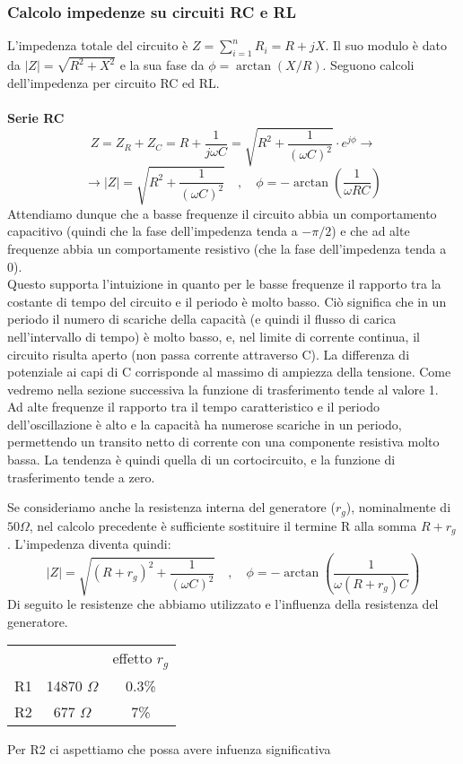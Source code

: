 \subsubsection{Calcolo impedenze su circuiti RC e RL}
L'impedenza totale del circuito è $Z = \sum_{i=1}^n R_i = R + jX$. Il suo modulo è dato da $|Z| = \sqrt{R^2 + X^2}$ e la sua fase da $\phi = \arctan (X/R)$. Seguono calcoli dell'impedenza per circuito RC ed RL.\\\\
%
\textbf{Serie RC}
    $$Z = Z_R+Z_C = R + \frac{1}{j\omega C} = \sqrt{ R^2+\frac{1}{(\omega C)^2} } \cdot{} e^{j\phi} \rightarrow $$
    $$\rightarrow|Z|= \sqrt{ R^2+\frac{1}{(\omega C)^2} } \quad,\quad \phi = -\arctan \left(\frac{1}{\omega R C}\right)$$
Attendiamo dunque che a basse frequenze il circuito abbia un comportamento capacitivo (quindi che la fase dell'impedenza tenda a $-\pi/2$) e che ad alte frequenze abbia un comportamente resistivo (che la fase dell'impedenza tenda a 0).\\
Questo supporta l'intuizione in quanto per le basse frequenze il rapporto tra la costante di tempo del circuito e il periodo è molto basso. Ciò significa che in un periodo il numero di scariche della capacità (e quindi il flusso di carica nell'intervallo di tempo) è molto basso, e, nel limite di corrente continua, il circuito risulta aperto (non passa corrente attraverso C). La differenza di potenziale ai capi di C corrisponde al massimo di ampiezza della tensione. Come vedremo nella sezione successiva la funzione di trasferimento tende al valore 1.\\
Ad alte frequenze il rapporto tra il tempo caratteristico e il periodo dell'oscillazione è alto e la capacità ha numerose scariche in un periodo, permettendo un transito netto di corrente con una componente resistiva molto bassa. La tendenza è quindi quella di un cortocircuito, e la funzione di trasferimento tende a zero.

Se consideriamo anche la resistenza interna del generatore ($r_g$), nominalmente di $50 \Omega$, nel calcolo precedente è sufficiente sostituire il termine R alla somma $R + r_g$. L'impedenza diventa quindi:
 $$|Z|= \sqrt{ (R+r_g)^2+\frac{1}{(\omega C)^2} } \quad,\quad \phi = -\arctan (\frac{1}{\omega (R+r_g) C})$$
%
Di seguito le resistenze che abbiamo utilizzato e l'influenza della resistenza del generatore.
\begin{center}
    \begin{tabular}{|c c c|}\hline
            &                   & effetto $r_g$  \\
         R1 & 14870 $\Omega$    & 0.3\%      \\
         R2 & 677 $\Omega$      & 7\%   \\\hline
    \end{tabular}
    \label{tab:C3_P1_effetto_rg}
\end{center}
%
Per R2 ci aspettiamo che possa avere infuenza significativa\\

